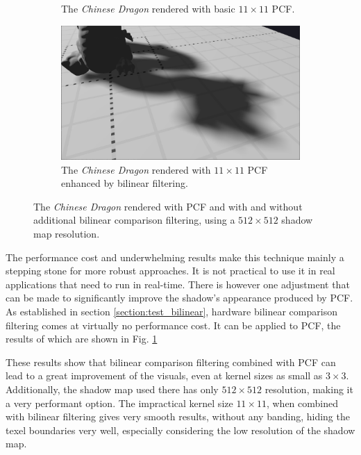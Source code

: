 \begin{figure}[h]
\begin{subfigure}[t]{0.45\textwidth}
        \caption{The \textit{Chinese Dragon} rendered with basic \(11\times 11\) PCF.}
    \end{subfigure}
	\hfill
    \begin{subfigure}[t]{0.45\textwidth}
		\centering
        \includegraphics[width=\textwidth]{./graf/tests/pcf/cropped/dragon_pcf_fhd_512_11x11_bilinear.png}
        \caption{The \textit{Chinese Dragon} rendered with \(11\times 11\) PCF enhanced by bilinear filtering.}
    \end{subfigure}

    \caption{The \textit{Chinese Dragon} rendered with PCF and with and without additional bilinear comparison filtering, using a \(512\times 512\) shadow map resolution.}
    \label{fig:test_pfc_bilinear_dragon_screens}
\end{figure}

The performance cost and underwhelming results make this technique mainly a stepping stone for more robust approaches. It is not practical to use it in real applications that need to run in real-time. There is however one adjustment that can be made to significantly improve the shadow's appearance produced by PCF. As established in section \ref{section:test_bilinear}, hardware bilinear comparison filtering comes at virtually no performance cost. It can be applied to PCF, the results of which are shown in Fig. \ref{fig:test_pfc_bilinear_dragon_screens}

These results show that bilinear comparison filtering combined with PCF can lead to a great improvement of the visuals, even at kernel sizes as small as \(3\times 3\). Additionally, the shadow map used there has only \(512\times 512\) resolution, making it a very performant option. The impractical kernel size \(11\times 11\), when combined with bilinear filtering gives very smooth results, without any banding, hiding the texel boundaries very well, especially considering the low resolution of the shadow map.

